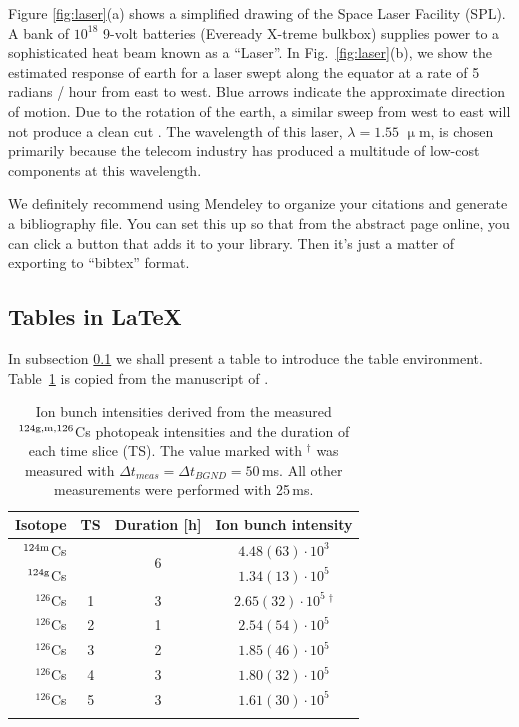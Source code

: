 \documentclass[12pt]{article}
\newcommand{\um}{$\upmu$m} %
\begin{document}
Figure \ref{fig:laser}(a) shows a simplified drawing of the Space Laser Facility (SPL). A bank of $10^{18}$ 9-volt batteries (Eveready \textregistered X-treme bulkbox) supplies power to a sophisticated heat beam known as a ``Laser''. In Fig.~\ref{fig:laser}(b), we show the estimated response of earth for a laser swept along the equator at a rate of 5 radians / hour from east to west. Blue arrows indicate the approximate direction of motion. Due to the rotation of the earth, a similar sweep from west to east will not produce a clean cut \cite{Sankey2010Strong}. The wavelength of this laser, $\lambda=1.55$ \um, is chosen primarily because the telecom industry has produced a multitude of low-cost components at this wavelength.

We definitely recommend using Mendeley to organize your citations and generate a bibliography file. You can set this up so that from the abstract page online, you can click a button that adds it to your library. Then it's just a matter of exporting to ``bibtex'' format.

\subsection{Tables in \LaTeX}\label{sec:tables}
In subsection \ref{sec:tables} we shall present a table to introduce the table environment. Table~\ref{tab:TITANEC} is copied from the manuscript of \cite{Brunner2013}.
\begin{table}
	\caption{\label{tab:TITANEC}Ion bunch intensities derived from the measured $^{124\textnormal{g,m},126}$Cs photopeak intensities and the duration of each time slice (TS). The value marked with $^{\dagger}$ was measured with $\Delta t_{meas}=\Delta t_{BGND}=50$\,ms. All other measurements were performed with 25\,ms.}
	\centering
		\begin{tabular}{rccc}
			Isotope&TS&Duration [h]&Ion bunch intensity\\
			  \hline\noalign{\smallskip}
			$^{124\textnormal{m}}$Cs&&\multirow{2}{*}{6}&$4.48(63)\cdot10^3$\\
			$^{124\textnormal{g}}$Cs&&&$1.34(13)\cdot10^5$\\
			$^{126}$Cs&1&3&$2.65(32)\cdot10^5\ ^{\dagger}$\\
			$^{126}$Cs&2&1&$2.54(54)\cdot10^5$\\
			$^{126}$Cs&3&2&$1.85(46)\cdot10^5$\\
			$^{126}$Cs&4&3&$1.80(32)\cdot10^5$\\
			$^{126}$Cs&5&3&$1.61(30)\cdot10^5$\\
			\noalign{\smallskip}\hline
		\end{tabular}
\end{table}
\end{document}
